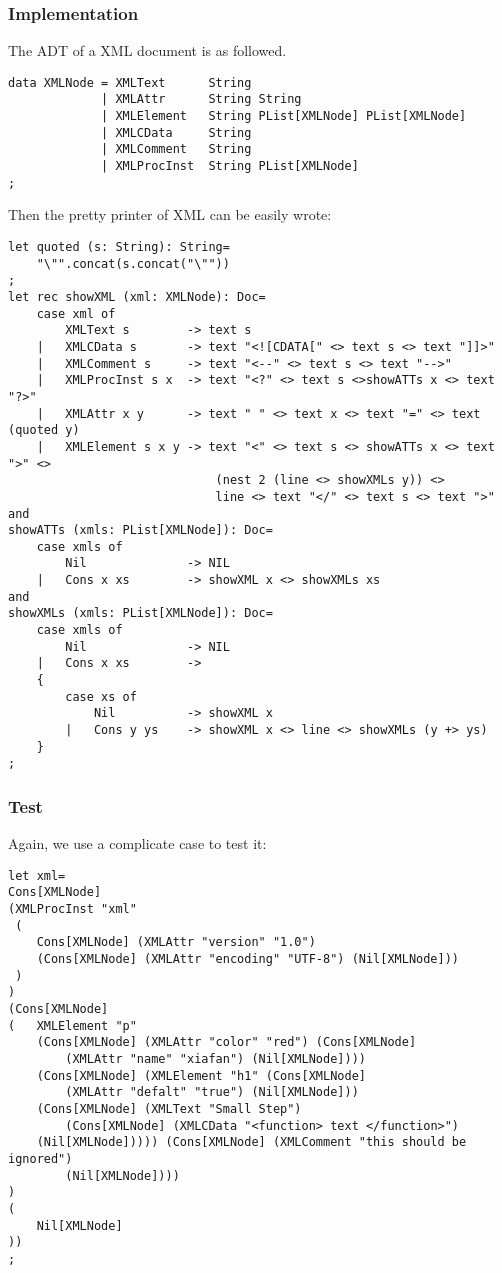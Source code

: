 \subsubsection{Implementation}
The ADT of a XML document is as followed.
\begin{lstlisting}
data XMLNode = XMLText      String
             | XMLAttr      String String
             | XMLElement   String PList[XMLNode] PList[XMLNode]
             | XMLCData     String
             | XMLComment   String
             | XMLProcInst  String PList[XMLNode]
;
\end{lstlisting}
Then the pretty printer of XML can be easily wrote:
\begin{lstlisting}
let quoted (s: String): String=
    "\"".concat(s.concat("\""))
;
let rec showXML (xml: XMLNode): Doc=
    case xml of
        XMLText s        -> text s
    |   XMLCData s       -> text "<![CDATA[" <> text s <> text "]]>"
    |   XMLComment s     -> text "<--" <> text s <> text "-->"
    |   XMLProcInst s x  -> text "<?" <> text s <>showATTs x <> text "?>"
    |   XMLAttr x y      -> text " " <> text x <> text "=" <> text (quoted y)
    |   XMLElement s x y -> text "<" <> text s <> showATTs x <> text ">" <>
                             (nest 2 (line <> showXMLs y)) <>
                             line <> text "</" <> text s <> text ">"
and
showATTs (xmls: PList[XMLNode]): Doc=
    case xmls of
        Nil              -> NIL
    |   Cons x xs        -> showXML x <> showXMLs xs
and
showXMLs (xmls: PList[XMLNode]): Doc=
    case xmls of
        Nil              -> NIL
    |   Cons x xs        ->
    {
        case xs of
            Nil          -> showXML x
        |   Cons y ys    -> showXML x <> line <> showXMLs (y +> ys)
    }
;
\end{lstlisting}

\subsubsection{Test}
Again, we use a complicate case to test it:
\begin{lstlisting}
let xml=
Cons[XMLNode]
(XMLProcInst "xml"
 (
    Cons[XMLNode] (XMLAttr "version" "1.0")
    (Cons[XMLNode] (XMLAttr "encoding" "UTF-8") (Nil[XMLNode]))
 )
)
(Cons[XMLNode]
(   XMLElement "p"
    (Cons[XMLNode] (XMLAttr "color" "red") (Cons[XMLNode]
        (XMLAttr "name" "xiafan") (Nil[XMLNode])))
    (Cons[XMLNode] (XMLElement "h1" (Cons[XMLNode]
        (XMLAttr "defalt" "true") (Nil[XMLNode]))
    (Cons[XMLNode] (XMLText "Small Step")
        (Cons[XMLNode] (XMLCData "<function> text </function>")
    (Nil[XMLNode])))) (Cons[XMLNode] (XMLComment "this should be ignored")
        (Nil[XMLNode])))
)
(
    Nil[XMLNode]
))
;
\end{lstlisting}

